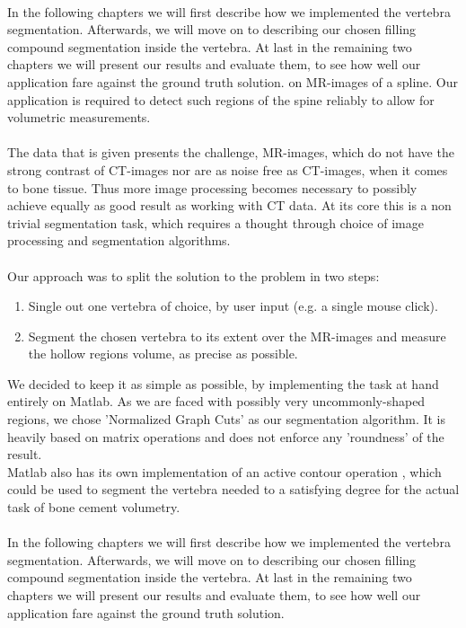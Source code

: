 \documentclass{article}
\begin{document}
{    \\In the following chapters we will first describe how we implemented the vertebra segmentation.
    Afterwards, we will move on to describing our chosen filling compound segmentation inside the vertebra.
    At last in the remaining two chapters we will present our results and evaluate them, to see how well our application fare against the ground truth solution.
    on MR-images of a spline.
    Our application is required 
    to detect such regions of the spine reliably to allow for volumetric measurements.\\
    \\The data that is given presents the challenge, MR-images, which do not have
    the strong contrast of CT-images nor are as noise free as CT-images, when it
    comes to bone tissue. Thus more image processing becomes necessary to possibly 
    achieve equally as good result as working with CT data.
    At its core this is a non trivial segmentation task, which requires a thought 
    through choice of image processing and segmentation algorithms.\\
    \\Our approach was to split the solution to the problem in two steps:
    \begin{enumerate}
      \item Single out one vertebra of choice, by user input (e.g. a single mouse click).
      \item Segment the chosen vertebra to its extent over the MR-images and measure the hollow regions volume, as precise as possible.
    \end{enumerate}
    We decided to keep it as simple as possible, by implementing the task at hand 
    entirely on Matlab. 
    As we are faced with possibly very uncommonly-shaped regions, we chose 'Normalized Graph Cuts' \cite{[ShiMalik00]} as our segmentation algorithm.
    It is heavily based on matrix operations and does not enforce any 'roundness' of the result.
    \\Matlab also has its own implementation of an active contour
    operation \cite{[ChanVese01]}, which could be used to segment the vertebra needed to a satisfying degree for the actual task of bone cement volumetry.\\	
    \\In the following chapters we will first describe how we implemented the vertebra segmentation.
    Afterwards, we will move on to describing our chosen filling compound segmentation inside the vertebra.
    At last in the remaining two chapters we will present our results and evaluate them, to see how well our application fare against the ground truth solution.
  }
  \pagebreak
\end{document}
